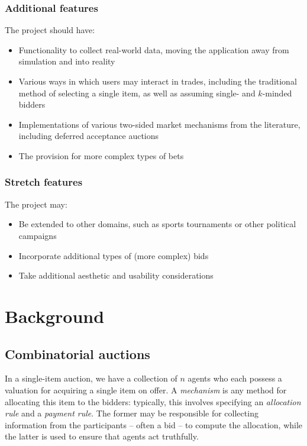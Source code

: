 \documentclass[10pt,a4paper]{article}
\theoremstyle{plain}
\theoremstyle{definition}
\begin{document}
	\subsubsection{Additional features}

	The project should have:

	\begin{itemize}
		\itemsep0em
		\item Functionality to collect real-world data, moving the application
			away from simulation and into reality

		\item Various ways in which users may interact in trades, including
			the traditional method of selecting a single item, as well as
			assuming single- and $k$-minded bidders

		\item Implementations of various two-sided market mechanisms from the
			literature, including deferred acceptance auctions

		\item The provision for more complex types of bets
	\end{itemize}

	\subsubsection{Stretch features}

	The project may:

	\begin{itemize}
		\itemsep0em
		\item Be extended to other domains, such as sports tournaments or other
			political campaigns

		\item Incorporate additional types of (more complex) bids

		\item Take additional aesthetic and usability considerations
	\end{itemize}

\section{Background}
	\label{sec:background}

	\subsection{Combinatorial auctions}

	In a single-item auction, we have a collection of $n$ agents who each
	possess a valuation for acquiring a single item on offer. A
	\emph{mechanism} is any method for allocating this item to the bidders:
	typically, this involves specifying an \emph{allocation rule} and a
	\emph{payment rule}. The former may be responsible for collecting
	information from the participants -- often a bid -- to compute the
	allocation, while the latter is used to ensure that agents act truthfully.
\end{document}
